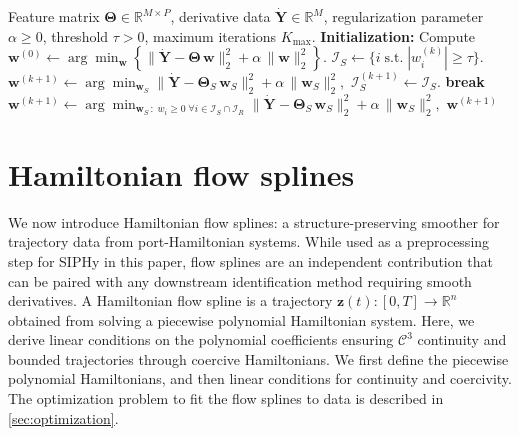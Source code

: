 \documentclass[11pt, a4paper]{article}
\theoremstyle{plain}
\theoremstyle{definition}
\theoremstyle{remark}
\begin{document}
\begin{algorithm}[!htb]
    \caption{Sequential Thresholded Least Squares (STLSQ) with nonnegative refit}
    \label{alg:stlsq}
    \begin{algorithmic}[1]
    \Require Feature matrix \(\boldsymbol{\Theta} \in \mathbb{R}^{M\times P}\), derivative data \(\dot{\mathbf{Y}} \in \mathbb{R}^{M}\), regularization parameter \(\alpha\ge0\), threshold \(\tau>0\), maximum iterations \(K_{\max}\).
    \State \textbf{Initialization:} Compute
    $
    \mathbf{w}^{(0)} \gets \arg\min_{\mathbf{w}} \left\{ \|\dot{\mathbf{Y}} - \boldsymbol{\Theta}\,\mathbf{w}\|_2^2 + \alpha\,\|\mathbf{w}\|_2^2 \right\}.
    $
        \State
        $\mathcal I_S \gets \{ i \; \mathrm{s.t.}\; |w^{(k)}_i| \ge \tau \}.$
        \State
        \(
        \mathbf{w}^{(k+1)} \gets \arg\min_{\mathbf{w}_S} \|\dot{\mathbf{Y}} - \boldsymbol{\Theta}_S\,\mathbf{w}_S\|_2^2 + \alpha\,\|\mathbf{w}_S\|_2^2,
        \) 
        \State $\mathcal I_S^{(k+1)} \gets \mathcal I_S$.
            \State \textbf{break}
        \EndIf
    \EndFor
        \State
        \(
        \mathbf{w}^{(k+1)} \gets \arg\min_{\mathbf{w}_{S}\,:\; w_i \ge 0\; \forall i \in \mathcal I_S \cap \mathcal I_R} \|\dot{\mathbf{Y}} - \boldsymbol{\Theta}_{S}\,\mathbf{w}_{S}\|_2^2 + \alpha\,\|\mathbf{w}_{S}\|_2^2,
        \) 
    \EndIf
    \State \Return \(\mathbf{w}^{(k+1)}\)
    \end{algorithmic}
    \end{algorithm}





\section{Hamiltonian flow splines}\label{sec:energy_splines}

We now introduce Hamiltonian flow splines: a structure-preserving smoother for trajectory data from port-Hamiltonian systems. While used as a preprocessing step for SIPHy in this paper, flow splines are an independent contribution that can be paired with any downstream identification method requiring smooth derivatives. A Hamiltonian flow spline is a trajectory $\mathbf{z}(t) : [0,T] \rightarrow \mathbb R^n$ obtained from solving a piecewise polynomial Hamiltonian system. Here, we derive linear conditions on the polynomial coefficients ensuring $\mathcal C^3$ continuity and bounded trajectories through coercive Hamiltonians. We first define the piecewise polynomial Hamiltonians, and then linear conditions for continuity and coercivity. The optimization problem to fit the flow splines to data is described in \cref{sec:optimization}.
\end{document}
